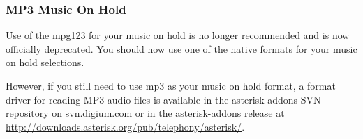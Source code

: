 \subsubsection{MP3 Music On Hold}

Use of the mpg123 for your music on hold is no longer recommended and is now
officially deprecated.  You should now use one of the native formats for your
music on hold selections.

However, if you still need to use mp3 as your music on hold format, a format
driver for reading MP3 audio files is available in the asterisk-addons SVN
repository on svn.digium.com or in the asterisk-addons release at
\url{http://downloads.asterisk.org/pub/telephony/asterisk/}.

